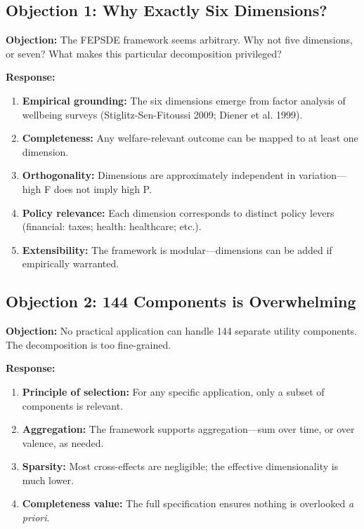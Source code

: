 \subsection{Objection 1: Why Exactly Six Dimensions?}

\textbf{Objection:} The FEPSDE framework seems arbitrary. Why not five dimensions, 
or seven? What makes this particular decomposition privileged?

\textbf{Response:}
\begin{enumerate}[nosep]
    \item \textbf{Empirical grounding:} The six dimensions emerge from factor 
    analysis of wellbeing surveys (Stiglitz-Sen-Fitoussi 2009; Diener et al. 1999).
    \item \textbf{Completeness:} Any welfare-relevant outcome can be mapped to 
    at least one dimension.
    \item \textbf{Orthogonality:} Dimensions are approximately independent in 
    variation---high F does not imply high P.
    \item \textbf{Policy relevance:} Each dimension corresponds to distinct 
    policy levers (financial: taxes; health: healthcare; etc.).
    \item \textbf{Extensibility:} The framework is modular---dimensions can be 
    added if empirically warranted.
\end{enumerate}

\subsection{Objection 2: 144 Components is Overwhelming}

\textbf{Objection:} No practical application can handle 144 separate utility 
components. The decomposition is too fine-grained.

\textbf{Response:}
\begin{enumerate}[nosep]
    \item \textbf{Principle of selection:} For any specific application, only 
    a subset of components is relevant.
    \item \textbf{Aggregation:} The framework supports aggregation---sum over 
    time, or over valence, as needed.
    \item \textbf{Sparsity:} Most cross-effects are negligible; the effective 
    dimensionality is much lower.
    \item \textbf{Completeness value:} The full specification ensures nothing 
    is overlooked \textit{a priori}.
\end{enumerate}

